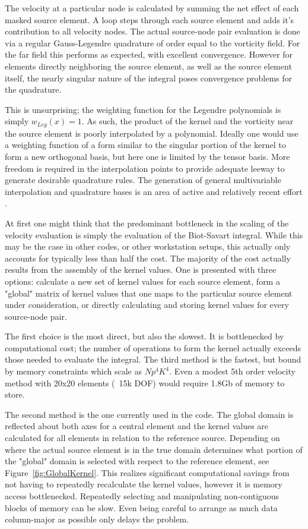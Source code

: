 \documentclass[letterpaper,12pt]{report}
\begin{document}
The velocity at a particular node is calculated by summing the net effect of each masked source element. A loop steps through each source element and adds it's contribution to all velocity nodes. The actual source-node pair evaluation is done via a regular Gauss-Legendre quadrature of order equal to the vorticity field. For the far field this performs as expected, with excellent convergence. However for elements directly neighboring the source element, as well as the source element itself, the nearly singular nature of the integral poses convergence problems for the quadrature.

This is unsurprising; the weighting function for the Legendre polynomials is simply $w_{Leg}(x)=1$. As such, the product of the kernel and the vorticity near the source element is poorly interpolated by a polynomial. Ideally one would use a weighting function of a form similar to the singular portion of the kernel to form a new orthogonal basis, but here one is limited by the tensor basis. More freedom is required in the interpolation points to provide adequate leeway to generate desirable quadrature rules. The generation of general multivariable interpolation and quadrature bases is an area of active and relatively recent effort \cite{Gasca2000,Xu2012,Gautschi2013}.

At first one might think that the predominant bottleneck in the scaling of the velocity evaluation is simply the evaluation of the Biot-Savart integral. While this may be the case in other codes, or other workstation setups, this actually only accounts for typically less than half the cost. The majority of the cost actually results from the assembly of the kernel values. One is presented with three options: calculate a new set of kernel values for each source element, form a "global" matrix of kernel values that one maps to the particular source element under consideration, or directly calculating and storing kernel values for every source-node pair.

The first choice is the most direct, but also the slowest. It is bottlenecked by computational cost; the number of operations to form the kernel actually exceeds those needed to evaluate the integral. The third method is the fastest, but bound by memory constraints which scale as $Np^4 K^4$. Even a modest 5th order velocity method with 20x20 elements (~15k DOF) would require 1.8Gb of memory to store.

The second method is the one currently used in the code. The global domain is reflected about both axes for a central element and the kernel values are calculated for all elements in relation to the reference source. Depending on where the actual source element is in the true domain determines what portion of the "global" domain is selected with respect to the reference element, see Figure~\ref{fig:GlobalKernel}. This realizes significant computational savings from not having to repeatedly recalculate the kernel values, however it is memory access bottlenecked. Repeatedly selecting and manipulating non-contiguous blocks of memory can be slow. Even being careful to arrange as much data column-major as possible only delays the problem.
\end{document}
